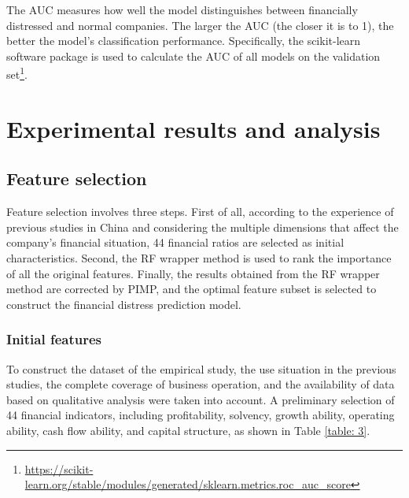 \documentclass[review]{elsarticle}
\begin{document}
The AUC measures how well the model distinguishes between financially distressed and normal companies. The larger the AUC (the closer it is to 1), the better the model's classification performance. Specifically, the scikit-learn software package is used to calculate the AUC of all models on the validation set\footnote{\url{https://scikit-learn.org/stable/modules/generated/sklearn.metrics.roc_auc_score}}.


\section{Experimental results and analysis}
\label{section_5}
\subsection{Feature selection}
Feature selection involves three steps. First of all, according to the experience of previous studies in China \citep{Chen2013, Sun2020, Zhu2019} and considering the multiple dimensions that affect the company's financial situation, 44 financial ratios are selected as initial characteristics. Second, the RF wrapper method is used to rank the importance of all the original features. Finally, the results obtained from the RF wrapper method are corrected by PIMP, and the optimal feature subset is selected to construct the financial distress prediction model.

\subsubsection{Initial features}
To construct the dataset of the empirical study, the use situation in the previous studies, the complete coverage of business operation, and the availability of data based on qualitative analysis were taken into account. A preliminary selection of 44 financial indicators, including profitability, solvency, growth ability, operating ability, cash flow ability, and capital structure, as shown in Table \ref{table: 3}.
\end{document}
